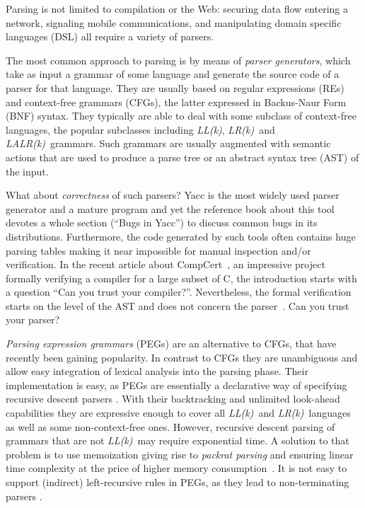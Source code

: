 \documentclass{LMCS}
\newcommand{\LLk}{\textit{LL(k)}}
\newcommand{\LRk}{\textit{LR(k)}}
\newcommand{\LALRk}{\textit{LALR(k)}}
\theoremstyle{definition}
\begin{document}
Parsing is not limited to compilation or the Web: securing data flow entering a
network, signaling mobile communications, and manipulating domain specific languages
(DSL) all require a variety of parsers.

The most common approach to parsing is by means of \textit{parser generators}, which
take as input a grammar of some language and generate the source code of a parser for 
that language. They are usually based on regular expressions (REs) 
and context-free grammars (CFGs), the latter expressed in Backus-Naur Form (BNF) syntax.
They typically are able to deal with some subclass of context-free languages, the
popular subclasses including \LLk, \LRk\ and \LALRk\ grammars. Such grammars are usually
augmented with semantic actions that are used to produce a parse tree or an abstract
syntax tree (AST) of the input.

What about \emph{correctness} of such parsers? 
Yacc is the most widely used parser generator and a mature program and yet the reference book about this tool~\cite{lexyacc} devotes a whole section (``Bugs in Yacc'') to discuss common bugs in its distributions.
Furthermore, the code generated by such tools often contains huge parsing tables making it near impossible for manual inspection and/or verification. In the recent article about CompCert~\cite{Ler09}, an impressive project formally verifying a compiler for a large subset of C, the introduction starts with a question ``Can you trust your compiler?''.  Nevertheless, the formal verification starts on the level of the AST and does not concern the parser~\cite[Figure 1]{Ler09}.
Can you trust your parser?

\emph{Parsing expression grammars} (PEGs) \cite{For04} are an alternative to CFGs,
that have recently been gaining popularity. In contrast to CFGs they are unambiguous and allow 
easy integration of lexical analysis into the parsing phase. Their implementation is easy, 
as PEGs are essentially a declarative way of specifying recursive descent parsers \cite{Bur75}. 
With their backtracking and unlimited look-ahead capabilities they are expressive enough to 
cover all \LLk\ and \LRk\ languages as well as some non-context-free ones. However, recursive 
descent parsing of grammars that are not \LLk\ may require exponential time. A solution to 
that problem is to use memoization giving rise to \emph{packrat parsing} and ensuring linear 
time complexity at the price of higher memory consumption~\cite{AhoUll72,For02,For02mth}.
It is not easy to support (indirect) left-recursive rules in PEGs, as they lead to 
non-terminating parsers \cite{WarEA08}.
\end{document}
